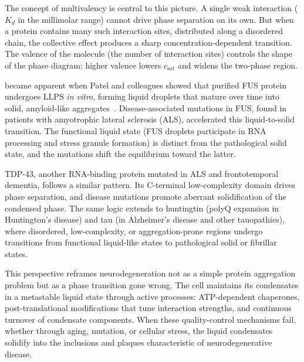 The concept of multivalency is central to this picture.  A single weak interaction ($K_d$ in
the millimolar range) cannot drive phase separation on its own.  But when a protein contains
many such interaction sites, distributed along a disordered chain, the collective effect
produces a sharp concentration-dependent transition.  The valence of the molecule (the number
of interaction sites) controls the shape of the phase diagram: higher valence lowers
$c_{\text{sat}}$ and widens the two-phase region.

 became apparent when Patel and colleagues showed that
purified FUS protein undergoes LLPS \textit{in vitro}, forming liquid droplets that mature
over time into solid, amyloid-like aggregates~\cite{patel2015}.  Disease-associated
mutations in FUS, found in patients with amyotrophic lateral sclerosis (ALS), accelerated
this liquid-to-solid transition.  The functional liquid state (FUS droplets participate in
RNA processing and stress granule formation) is distinct from the pathological solid state,
and the mutations shift the equilibrium toward the latter.

TDP-43, another RNA-binding protein mutated in ALS and frontotemporal dementia, follows a
similar pattern.  Its C-terminal low-complexity domain drives phase separation, and disease
mutations promote aberrant solidification of the condensed phase.  The same logic extends to
huntingtin (polyQ expansion in Huntington's disease) and tau (in Alzheimer's disease and
other tauopathies), where disordered, low-complexity, or aggregation-prone regions undergo
transitions from functional liquid-like states to pathological solid or fibrillar states.

This perspective reframes neurodegeneration not as a simple protein aggregation problem but
as a phase transition gone wrong.  The cell maintains its condensates in a metastable liquid
state through active processes: ATP-dependent chaperones, post-translational modifications
that tune interaction strengths, and continuous turnover of condensate components.  When
these quality-control mechanisms fail, whether through aging, mutation, or cellular stress,
the liquid condensates solidify into the inclusions and plaques characteristic of
neurodegenerative disease.


